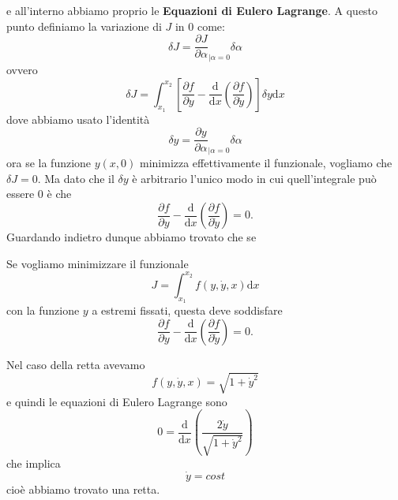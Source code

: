 \documentclass[11pt]{scrartcl}
\newcommand{\dif}{\text{d}}
\begin{document}
	e all'interno abbiamo proprio le \textbf{Equazioni di Eulero Lagrange}. A questo punto definiamo la variazione di $J$ in $0$ come:
	$$\delta J=\frac{\partial J}{\partial \alpha}_{\mid \alpha=0}\delta \alpha$$
	ovvero
	$$\delta J=\int_{x_1}^{x_2}\left[\frac{\partial f}{\partial y}-\frac{\dif }{\dif x}\left(\frac{\partial f}{\partial \dot{y}}\right)\right]\delta y\dif x$$
	dove abbiamo usato l'identità
	$$\delta y = \frac{\partial y}{\partial \alpha}_{\mid \alpha =0}\delta \alpha$$
	ora se la funzione $y(x,0)$ minimizza effettivamente il funzionale, vogliamo che $\delta J=0$. Ma dato che il $\delta y$ è arbitrario l'unico modo in cui quell'integrale può essere $0$ è che 
	$$\frac{\partial f}{\partial y}-\frac{\dif }{\dif x}\left(\frac{\partial f}{\partial \dot{y}}\right)=0.$$
	Guardando indietro dunque abbiamo trovato che se 
	\begin{theorem}
		Se vogliamo minimizzare il funzionale
		$$J=\int_{x_1}^{x_2}f(y,\dot{y},x)\dif x$$
		con la funzione $y$ a estremi fissati, questa deve soddisfare
		$$\frac{\partial f}{\partial y}-\frac{\dif }{\dif x}\left(\frac{\partial f}{\partial \dot{y}}\right)=0.$$
	\end{theorem}
	Nel caso della retta avevamo 
	$$f(y,\dot{y},x)=\sqrt{1+\dot{y}^2}$$
	e quindi le equazioni di Eulero Lagrange sono
	$$0=\frac{\dif}{\dif x}\left(\frac{2\dot{y}}{\sqrt{1+\dot{y}^2}}\right)$$
	che implica
	$$\dot{y}=cost$$
	cioè abbiamo trovato una retta. 
	
\end{document}
